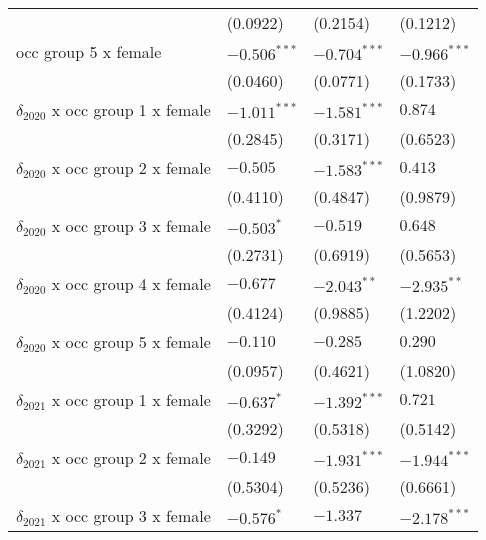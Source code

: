 \begin{tabular}{llll}
                                       &           (0.0922) &           (0.2154) &           (0.1212) \\
occ group 5 x female                   &     $-0.506^{***}$ &     $-0.704^{***}$ &     $-0.966^{***}$ \\
                                       &           (0.0460) &           (0.0771) &           (0.1733) \\
$\delta_{2020}$ x occ group 1 x female &     $-1.011^{***}$ &     $-1.581^{***}$ &            $0.874$ \\
                                       &           (0.2845) &           (0.3171) &           (0.6523) \\
$\delta_{2020}$ x occ group 2 x female &           $-0.505$ &     $-1.583^{***}$ &            $0.413$ \\
                                       &           (0.4110) &           (0.4847) &           (0.9879) \\
$\delta_{2020}$ x occ group 3 x female &         $-0.503^*$ &           $-0.519$ &            $0.648$ \\
                                       &           (0.2731) &           (0.6919) &           (0.5653) \\
$\delta_{2020}$ x occ group 4 x female &           $-0.677$ &      $-2.043^{**}$ &      $-2.935^{**}$ \\
                                       &           (0.4124) &           (0.9885) &           (1.2202) \\
$\delta_{2020}$ x occ group 5 x female &           $-0.110$ &           $-0.285$ &            $0.290$ \\
                                       &           (0.0957) &           (0.4621) &           (1.0820) \\
$\delta_{2021}$ x occ group 1 x female &         $-0.637^*$ &     $-1.392^{***}$ &            $0.721$ \\
                                       &           (0.3292) &           (0.5318) &           (0.5142) \\
$\delta_{2021}$ x occ group 2 x female &           $-0.149$ &     $-1.931^{***}$ &     $-1.944^{***}$ \\
                                       &           (0.5304) &           (0.5236) &           (0.6661) \\
$\delta_{2021}$ x occ group 3 x female &         $-0.576^*$ &           $-1.337$ &     $-2.178^{***}$ \\

\end{tabular}
